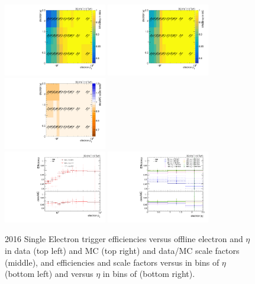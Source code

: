 \begin{figure}[htbp]
  \centering
  \includegraphics[width=0.4\textwidth]{fig/eventSelection/TriggerEff_ELE_DATA_abseta_2016.pdf}
  \includegraphics[width=0.4\textwidth]{fig/eventSelection/TriggerEff_ELE_MC_abseta_2016.pdf}\\
  \includegraphics[width=0.4\textwidth]{fig/eventSelection/TriggerSF_ELE_2016.pdf}\\
  \includegraphics[width=0.4\textwidth]{fig/eventSelection/TriggerEff1DPt_ELE2016.pdf}
  \includegraphics[width=0.4\textwidth]{fig/eventSelection/TriggerEff1DAbsEta_ELE2016.pdf}\\
  \caption{
    2016 Single Electron trigger efficiencies versus offline electron \pt and $\eta$ in data (top left) and MC (top right) and data/MC scale factors (middle), and efficiencies and scale factors versus \pt in bins of $\eta$ (bottom left) and versus $\eta$ in bins of \pt (bottom right).
  }
  \label{fig:eletrigeff2016}
\end{figure}

